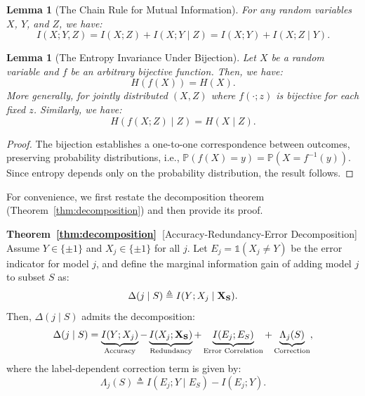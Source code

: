 \documentclass{article}
\theoremstyle{plain}
\newtheorem{lemma}[theorem]{Lemma}
\theoremstyle{definition}
\theoremstyle{remark}
\begin{document}
\begin{lemma}[The Chain Rule for Mutual Information]
\label{lem:chain_rule}
For any random variables $X$, $Y$, and $Z$, we have:
\begin{equation}
    I(X; Y, Z) = I(X; Z) + I(X; Y \mid Z) = I(X; Y) + I(X; Z \mid Y).
\end{equation}
\end{lemma}

\begin{lemma}[The Entropy Invariance Under Bijection]
\label{lem:bijection}
Let $X$ be a random variable and $f$ be an arbitrary bijective function. Then, we have:
\begin{equation}
    H(f(X)) = H(X).
\end{equation}
More generally, for jointly distributed $(X, Z)$ where $f(\cdot; z)$ is bijective for each fixed $z$. Similarly, we have:
\begin{equation}
    H(f(X; Z) \mid Z) = H(X \mid Z).
\end{equation}
\end{lemma}

\begin{proof}
The bijection establishes a one-to-one correspondence between outcomes, preserving probability distributions, i.e., $\mathbb{P}(f(X) = y) = \mathbb{P}(X = f^{-1}(y))$. Since entropy depends only on the probability distribution, the result follows.
\end{proof}

For convenience, we first restate the decomposition theorem (Theorem~\ref{thm:decomposition}) and then provide its proof.


{\bf Theorem~\ref{thm:decomposition}~}[Accuracy-Redundancy-Error Decomposition]
Assume $Y\in\{\pm1\}$ and $X_j\in\{\pm1\}$ for all $j$.
Let $E_j = \mathds{1}(X_j \neq Y)$ be the error indicator for model $j$, and define the marginal information gain of adding model $j$ to subset $S$ as:
\begin{equation}
    \Delta(j \mid S) \triangleq I(Y; X_j \mid {\bf X_S}).
\end{equation}
Then, $\Delta(j \mid S)$ admits the decomposition:
\begin{equation}
\label{eq:general_decomposition_restate}
    \Delta(j \mid S) = \underbrace{I(Y; X_j)}_{\text{Accuracy}} - \underbrace{I(X_j; {\bf X_S})}_{\text{Redundancy}} + \underbrace{I(E_j; E_S)}_{\text{Error Correlation}} + \underbrace{\Lambda_j(S)}_{\text{Correction}},
\end{equation}
where the label-dependent correction term is given by:
\begin{equation}
\label{eq:correction_term_restate}
    \Lambda_j(S) \triangleq I(E_j; Y \mid E_S) - I(E_j; Y).
\end{equation}
\end{document}
